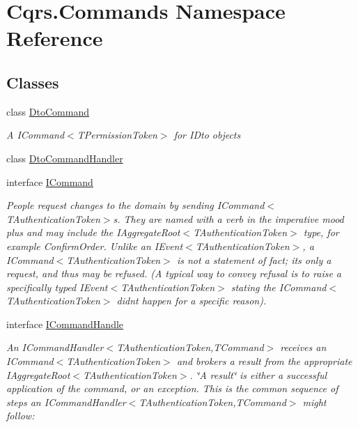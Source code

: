 \hypertarget{namespaceCqrs_1_1Commands}{}\section{Cqrs.\+Commands Namespace Reference}
\label{namespaceCqrs_1_1Commands}
\subsection*{Classes}
\begin{DoxyCompactItemize}
\item 
class \hyperlink{classCqrs_1_1Commands_1_1DtoCommand}{Dto\+Command}
\begin{DoxyCompactList}\small\item\em A I\+Command$<$\+T\+Permission\+Token$>$ for I\+Dto objects \end{DoxyCompactList}\item 
class \hyperlink{classCqrs_1_1Commands_1_1DtoCommandHandler}{Dto\+Command\+Handler}
\item 
interface \hyperlink{interfaceCqrs_1_1Commands_1_1ICommand}{I\+Command}
\begin{DoxyCompactList}\small\item\em People request changes to the domain by sending I\+Command$<$\+T\+Authentication\+Token$>$s. They are named with a verb in the imperative mood plus and may include the I\+Aggregate\+Root$<$\+T\+Authentication\+Token$>$ type, for example Confirm\+Order. Unlike an I\+Event$<$\+T\+Authentication\+Token$>$, a I\+Command$<$\+T\+Authentication\+Token$>$ is not a statement of fact; it\textquotesingle{}s only a request, and thus may be refused. (A typical way to convey refusal is to raise a specifically typed I\+Event$<$\+T\+Authentication\+Token$>$ stating the I\+Command$<$\+T\+Authentication\+Token$>$ didn\textquotesingle{}t happen for a specific reason). \end{DoxyCompactList}\item 
interface \hyperlink{interfaceCqrs_1_1Commands_1_1ICommandHandle}{I\+Command\+Handle}
\begin{DoxyCompactList}\small\item\em An I\+Command\+Handler$<$\+T\+Authentication\+Token,\+T\+Command$>$ receives an I\+Command$<$\+T\+Authentication\+Token$>$ and brokers a result from the appropriate I\+Aggregate\+Root$<$\+T\+Authentication\+Token$>$. \char`\"{}\+A result\char`\"{} is either a successful application of the command, or an exception. This is the common sequence of steps an I\+Command\+Handler$<$\+T\+Authentication\+Token,\+T\+Command$>$ might follow\+: \end{DoxyCompactList}\item 

\end{DoxyCompactItemize}
